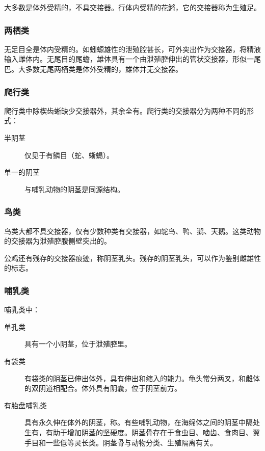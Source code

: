 大多数是体外受精的，不具交接器。行体内受精的花鳉，它的交接器称为生殖足。

\subsubsection{两栖类}

无足目全是体内受精的。如蚓螈雄性的泄殖腔甚长，可外突出作为交接器，将精液输入雌体内。无尾目的尾蟾，雄体具有一个由泄殖腔伸出的管状交接器，形似一尾巴。大多数无尾两栖类是体外受精的，雄体并无交接器。

\subsubsection{爬行类}

爬行类中除楔齿蜥缺少交接器外，其余全有。爬行类的交接器分为两种不同的形式：

\begin{description}
	\item[半阴茎] 仅见于有鳞目（蛇、蜥蜴）。
	\item[单一的阴茎] 与哺乳动物的阴茎是同源结构。
\end{description}

\subsubsection{鸟类}

鸟类大都不具交接器，仅有少数种类有交接器，如鸵鸟、鸭、鹅、天鹅。这类动物的交接器为泄殖腔腹侧壁突出的。

公鸡还有残存的交接器痕迹，称阴茎乳头。残存的阴茎乳头，可以作为鉴别雌雄性的标志。

\subsubsection{哺乳类}

哺乳类中：

\begin{description}
	\item[单孔类] 具有一个小阴茎，位于泄殖腔里。
	\item[有袋类] 有袋类的阴茎已伸出体外，具有伸出和缩入的能力。龟头常分两叉，和雌体的双阴道相配合。体外具有阴囊，位于阴茎前方。
	\item[有胎盘哺乳类] 具有永久伸在体外的阴茎，称。有些哺乳动物，在海绵体之间的阴茎中隔处生有，有助于增加阴茎的坚硬度。阴茎骨存在于食虫目、啮齿、食肉目、翼手目和一些低等灵长类。阴茎骨与动物分类、生殖隔离有关。
\end{description}

